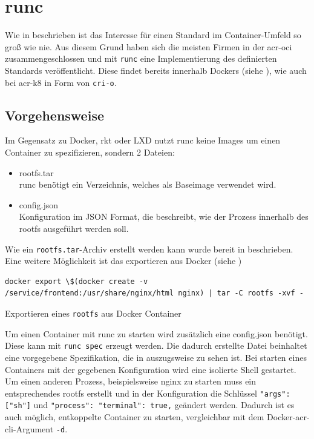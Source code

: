 \section{runc}
\label{sec:compRunc}

Wie in  beschrieben ist das Interesse für einen Standard im Container-Umfeld so groß wie nie. Aus diesem Grund haben sich die meisten Firmen in der \gls{acr-oci} zusammengeschlossen und mit \texttt{runc} eine Implementierung des definierten Standards veröffentlicht. Diese findet bereits innerhalb Dockers (siehe ), wie auch bei \gls{acr-k8} in Form von \texttt{cri-o}.

\subsection{Vorgehensweise}
\label{sec:compRuncVorgehen}

Im Gegensatz zu Docker, rkt oder LXD nutzt runc keine Images um einen Container zu spezifizieren, sondern 2 Dateien:
\begin{itemize}
	\item rootfs.tar \\
	runc benötigt ein Verzeichnis, welches als Baseimage verwendet wird.
	\item config.json \\
	Konfiguration im JSON Format, die beschreibt, wie der Prozess innerhalb des rootfs ausgeführt werden soll.
\end{itemize}

Wie ein \texttt{rootfs.tar}-Archiv erstellt werden kann wurde bereit in  beschrieben. Eine weitere Möglichkeit ist das exportieren aus Docker (siehe )

\begin{listing}[h]
	\begin{verbatim}
docker export \$(docker create -v /service/frontend:/usr/share/nginx/html nginx) | tar -C rootfs -xvf -
	\end{verbatim}
	\caption{Exportieren eines \texttt{rootfs} aus Docker Container}
	\label{lst:dockerExport}
\end{listing}

Um einen Container mit runc zu starten wird zusätzlich eine config.json benötigt. Diese kann mit \texttt{runc spec} erzeugt werden. Die dadurch erstellte Datei beinhaltet eine vorgegebene Spezifikation, die in  auszugsweise zu sehen ist. Bei starten eines Containers mit der gegebenen Konfiguration wird eine isolierte Shell gestartet. Um einen anderen Prozess, beispielsweise nginx zu starten muss ein entsprechendes rootfs erstellt und in der Konfiguration die Schlüssel \texttt{{"args": ["sh"]}} und \texttt{{"process": {"terminal": true,}}} geändert werden. Dadurch ist es auch möglich, entkoppelte Container zu starten, vergleichbar mit dem Docker-\gls{acr-cli}-Argument \texttt{-d}.

